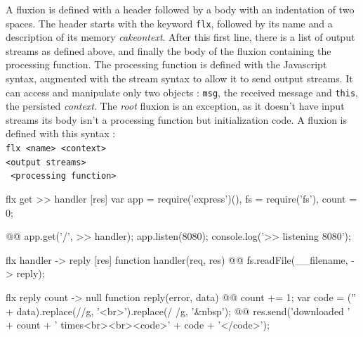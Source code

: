 A fluxion is defined with a header followed by a body with an indentation of two spaces.
The header starts with the keyword \texttt{flx}, followed by its name and a description of its memory \textit{cakeontext}.
After this first line, there is a list of output streams as defined above, and finally the body of the fluxion containing the processing function.
The processing function is defined with the Javascript syntax, augmented with the stream syntax to allow it to send output streams.
It can access and manipulate only two objects : \texttt{msg}, the received message and \texttt{this}, the persisted \textit{context}.
The \textit{root} fluxion is an exception, as it doesn't have input streams its body isn't a processing function but initialization code.
A fluxion is defined with this syntax :\\
\texttt{flx <name> {<context>}}\\
\texttt{<output streams>}\\
\texttt{  <processing function>}\\


\begin{code}[flx, caption={Manual transformation of the example application in our high-level fluxional language},label={lst:fluxional}]
flx get
>> handler [res]
  var app = require('express')(),
      fs = require('fs'),
      count = 0;

@\label{lst:fluxional-streamtohandler}@  app.get('/', >> handler);
  app.listen(8080);
  console.log('>> listening 8080');

flx handler
-> reply [res]
  function handler(req, res) {
@\label{lst:fluxional-readfile}@      fs.readFile(__filename, -> reply);
  }

flx reply {count}
-> null
  function reply(error, data) {
@\label{lst:fluxional-counter}@    count += 1;
    var code = ('' + data).replace(/\n/g, '<br>').replace(/ /g, '&nbsp');
@\label{lst:fluxional-ressend}@    res.send('downloaded ' + count + ' times<br><br><code>' + code + '</code>');
  }
\end{code}

